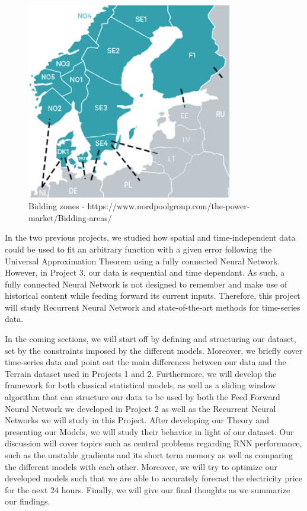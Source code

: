 \documentclass
[twocolumn,
secnumarabic,
nobibnotes,
aps,
prl,
reprint,
groupedaddress,
amsmath,
amssymb,
]{revtex4-2}
\begin{document}
\begin{figure}[t]
  \centering
  \includegraphics[width=90mm,scale=1.0]{figures/bidding_zones.png}
  \caption{Bidding zones - https://www.nordpoolgroup.com/the-power-market/Bidding-areas/}
  \label{fig:biddin_zones}
\end{figure}

In the two previous projects, we studied how spatial and time-independent data could be used to fit an arbitrary function with a given error following the Universal Approximation Theorem \cite{Nielsen2015} using a fully connected Neural Network. However, in Project 3, our data is sequential and time dependant. As such, a fully connected Neural Network is not designed to remember and make use of historical content while feeding forward its current inputs. Therefore, this project will study Recurrent Neural Network and state-of-the-art methods for time-series data.

In the coming sections, we will start off by defining and structuring our dataset, set by the constraints imposed by the different models. Moreover, we briefly cover time-series data and point out the main differences between our data and the Terrain dataset used in Projects 1 and 2. Furthermore, we will develop the framework for both classical statistical models, as well as a sliding window algorithm that can structure our data to be used by both the Feed Forward Neural Network we developed in Project 2 as well as the Recurrent Neural Networks we will study in this Project. After developing our Theory and presenting our Models, we will study their behavior in light of our dataset. Our discussion will cover topics such as central problems regarding RNN performance, such as the unstable gradients and its short term memory as well as comparing the different models with each other. Moreover, we will try to optimize our developed models such that we are able to accurately forecast the electricity price for the next 24 hours. Finally, we will give our final thoughts as we summarize our findings.
\end{document}
